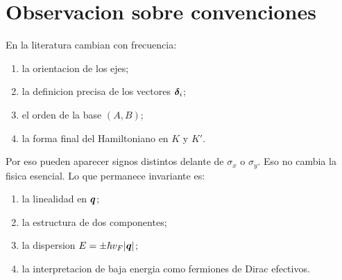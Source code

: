 \section{Observacion sobre convenciones}

En la literatura cambian con frecuencia:

\begin{enumerate}[leftmargin=*]
  \item la orientacion de los ejes;
  \item la definicion precisa de los vectores \(\bm{\delta}_i\);
  \item el orden de la base \((A,B)\);
  \item la forma final del Hamiltoniano en \(K\) y \(K'\).
\end{enumerate}

Por eso pueden aparecer signos distintos delante de \(\sigma_x\) o \(\sigma_y\). Eso no cambia la fisica esencial. Lo que permanece invariante es:

\begin{enumerate}[leftmargin=*]
  \item la linealidad en \(\bm{q}\);
  \item la estructura de dos componentes;
  \item la dispersion \(E=\pm \hbar v_F |\bm{q}|\);
  \item la interpretacion de baja energia como fermiones de Dirac efectivos.
\end{enumerate}
